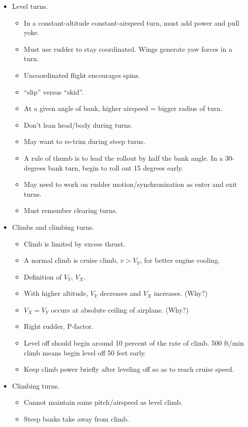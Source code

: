 \documentclass[letterpaper,10pt,titlepage]{article}
\begin{document}
\begin{itemize}
\item Level turns.
	  \begin{itemize}
	  \item In a constant-altitude constant-airspeed turn, must add power and pull yoke.
	  \item Must use rudder to stay coordinated.  Wings generate yaw forces in a turn.
	  \item Uncoordinated flight encourages spins.
	  \item ``slip'' versus ``skid''.
	  \item At a given angle of bank, higher airspeed = bigger radius of turn.
	  \item Don't lean head/body during turns.
	  \item May want to re-trim during steep turns.
	  \item A rule of thumb is to lead the rollout by half the bank angle.  In a 30-degrees
	        bank turn, begin to roll out 15 degrees early.
	  \item May need to work on rudder motion/synchronization as enter and exit turns.
	  \item Must remember clearing turns.
	  \end{itemize}
\item Climbs and climbing turns.
	  \begin{itemize}
	  \item Climb is limited by excess thrust.
	  \item A normal climb is cruise climb, $v > V_Y$, for better engine cooling.
	  \item Definition of $V_Y$, $V_X$.
	  \item With higher altitude, $V_Y$ decreases and $V_X$ increases.  (Why?)
	  \item $V_X = V_Y$ occurs at absolute ceiling of airplane.  (Why?)
	  \item Right rudder, P-factor.
	  \item Level off should begin around 10 percent of the rate of climb.  500 ft/min climb
	        means begin level off 50 feet early.
	  \item Keep climb power briefly after leveling off so as to reach cruise speed.
	  \end{itemize}
\item Climbing turns.
	  \begin{itemize}
	  \item Cannot maintain same pitch/airspeed as level climb.
	  \item Steep banks take away from climb.

\end{itemize}
\end{itemize}
\end{document}
